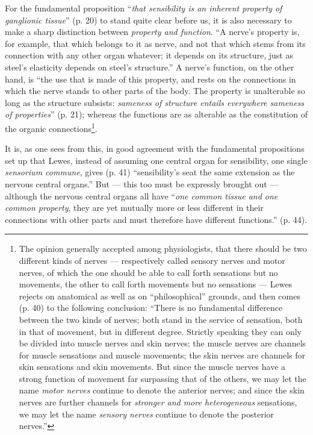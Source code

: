 \documentclass[12pt,a4paper]{book}
\begin{document}
For the fundamental proposition ``\emph{that sensibility is an inherent property of
ganglionic tissue}'' (p. 20) to stand quite clear before us, it is also necessary to
make a sharp distinction between \emph{property and function}. ``A nerve's property
is, for example, that which belongs to it as nerve, and not that which stems from
its connection with any other organ whatever; it depends on its structure, just as
steel's elasticity depends on steel's structure.'' A nerve's function, on the other
hand, is ``the use that is made of this property, and rests on the connections in
which the nerve stands to other parts of the body. The property is unalterable so
long as the structure subsists: \emph{sameness of structure entails everywhere
sameness of properties}'' (p. 21); whereas the functions are as alterable as the
constitution of the organic connections\footnote{The opinion generally accepted
among physiologists, that there should be two different kinds of nerves ---
respectively called sensory nerves and motor nerves, of which the one should be able
to call forth sensations but no movements, the other to call forth movements but no
sensations --- Lewes rejects on anatomical as well as on ``philosophical'' grounds,
and then comes (p. 40) to the following conclusion: ``There is no fundamental
difference between the two kinds of nerves; both stand in the service of sensation,
both in that of movement, but in different degree. Strictly speaking they can only
be divided into muscle nerves and skin nerves; the muscle nerves are channels for
muscle sensations and muscle movements; the skin nerves are channels for skin
sensations and skin movements. But since the muscle nerves have a strong function of
movement far surpassing that of the others, we may let the name \emph{motor nerves}
continue to denote the anterior nerves; and since the skin nerves are further
channels for \emph{stronger and more heterogeneous} sensations, we may let the name
\emph{sensory nerves} continue to denote the posterior nerves.''}.

It is, as one sees from this, in good agreement with the fundamental propositions
set up that Lewes, instead of assuming one central organ for sensibility, one single
\textit{sensorium commune}, gives (p. 41) ``sensibility's seat the same extension as
the nervous central organs.'' But --- this too must be expressly brought out ---
although the nervous central organs all have ``\emph{one common tissue and one common
property}, they are yet mutually more or less different in their connections with
other parts and must therefore have different functions.'' (p. 44).
\end{document}
